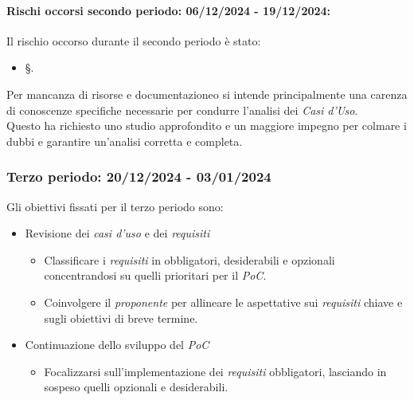 \paragraph{Rischi occorsi secondo periodo: 06/12/2024 - 19/12/2024: }
Il rischio occorso durante il secondo periodo è stato:
\begin{itemize}
    \item \S{}.
\end{itemize}
Per mancanza di risorse e documentazioneo si intende principalmente una carenza di conoscenze specifiche necessarie per condurre l’analisi dei \emph{Casi d’Uso}.\\
Questo ha richiesto uno studio approfondito e un maggiore impegno per colmare i dubbi e garantire un’analisi corretta e completa. 


\newpage
\subsubsection{Terzo periodo: 20/12/2024 - 03/01/2024}  
\label{sec:prev_cons_terzo_periodo}  

Gli obiettivi fissati per il terzo periodo sono:  
\begin{itemize}  
    \item Revisione dei \emph{casi d’uso} e dei \emph{requisiti} 
    \begin{itemize}  
        \item Classificare i \emph{requisiti} in obbligatori, desiderabili e opzionali concentrandosi su quelli prioritari per il \emph{PoC}.  
        \item Coinvolgere il \emph{proponente} per allineare le aspettative sui \emph{requisiti} chiave e sugli obiettivi di breve termine.  
    \end{itemize}  
    \item Continuazione dello sviluppo del \emph{PoC}
    \begin{itemize}  
        \item Focalizzarsi sull’implementazione dei \emph{requisiti} obbligatori, lasciando in sospeso quelli opzionali e desiderabili.    
    \end{itemize}   
\end{itemize} 


